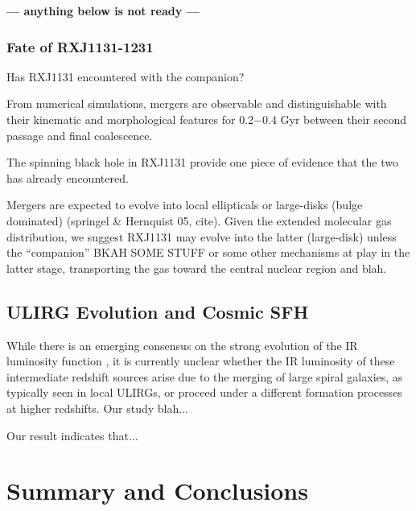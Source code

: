 \documentclass[]{emulateapj}
\begin{document}
{\bf --- anything below is not ready ---}
\subsubsection{Fate of RXJ1131-1231}
Has RXJ1131 encountered with the companion?

From numerical simulations, mergers are observable and distinguishable
with their kinematic and morphological features for 0.2$-$0.4 Gyr
between their second passage and final coalescence.

The spinning black hole in RXJ1131 provide one piece of
evidence that the two has already encountered.


Mergers are expected to evolve into
local ellipticals or large-disks (bulge dominated) (springel \& Hernquist 05, cite).
Given the
extended molecular gas distribution, we suggest RXJ1131 may evolve into the
latter (large-disk) unless the ``companion'' BKAH SOME STUFF or some other
mechanisms at play in the latter stage, transporting the gas
toward the central nuclear region and blah.

\subsection{ULIRG Evolution and Cosmic SFH}
While there is an emerging consensus on the strong
evolution of the IR luminosity function \citep[\eg][]{Huynh07a,Seymour10a},
it is currently unclear whether the IR luminosity of
these intermediate redshift sources arise due to the merging of large spiral
galaxies, as typically seen in local ULIRGs, or proceed under a different
formation processes at higher redshifts. Our study blah...

Our result indicates that...

\section{Summary and Conclusions} \label{sec:sum}
\end{document}
